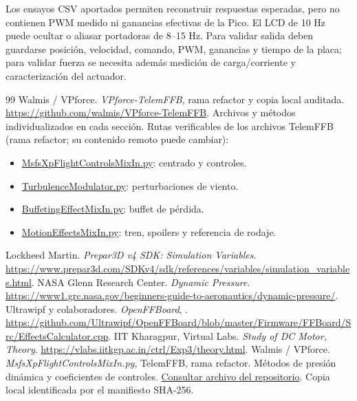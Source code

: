 \documentclass[11pt,a4paper]{article}
\newcommand{\code}[1]{\texttt{\detokenize{#1}}}
\begin{document}
Los ensayos CSV aportados permiten reconstruir respuestas esperadas, pero no contienen PWM medido ni ganancias efectivas de la Pico. El LCD de 10 Hz puede ocultar o aliasar portadoras de 8--15 Hz. Para validar salida deben guardarse posición, velocidad, comando, PWM, ganancias y tiempo de la placa; para validar fuerza se necesita además medición de carga/corriente y caracterización del actuador.

\begin{thebibliography}{99}
 Walmis / VPforce. \emph{VPforce-TelemFFB}, rama refactor y copia local auditada. \url{https://github.com/walmis/VPforce-TelemFFB}. Archivos y métodos individualizados en cada sección.
 Rutas verificables de los archivos TelemFFB (rama refactor; su contenido remoto puede cambiar):
\begin{itemize}
\item \href{https://github.com/walmis/VPforce-TelemFFB/blob/refactor/telemffb/sim/msfs_xp/MsfsXpFlightControlsMixIn.py}{MsfsXpFlightControlsMixIn.py}: centrado y controles.
\item \href{https://github.com/walmis/VPforce-TelemFFB/blob/refactor/telemffb/utils/TurbulenceModulator.py}{TurbulenceModulator.py}: perturbaciones de viento.
\item \href{https://github.com/walmis/VPforce-TelemFFB/blob/refactor/telemffb/sim/base/BuffetingEffectMixIn.py}{BuffetingEffectMixIn.py}: buffet de pérdida.
\item \href{https://github.com/walmis/VPforce-TelemFFB/blob/refactor/telemffb/sim/base/MotionEffectsMixIn.py}{MotionEffectsMixIn.py}: tren, spoilers y referencia de rodaje.
\end{itemize}
 Lockheed Martin. \emph{Prepar3D v4 SDK: Simulation Variables}. \url{https://www.prepar3d.com/SDKv4/sdk/references/variables/simulation_variables.html}.
 NASA Glenn Research Center. \emph{Dynamic Pressure}. \url{https://www1.grc.nasa.gov/beginners-guide-to-aeronautics/dynamic-pressure/}.
 Ultrawipf y colaboradores. \emph{OpenFFBoard}, \code{Firmware/FFBoard/Src/EffectsCalculator.cpp}. \url{https://github.com/Ultrawipf/OpenFFBoard/blob/master/Firmware/FFBoard/Src/EffectsCalculator.cpp}.
 IIT Kharagpur, Virtual Labs. \emph{Study of DC Motor, Theory}. \url{https://vlabs.iitkgp.ac.in/ctrl/Exp3/theory.html}.
 Walmis / VPforce. \emph{MsfsXpFlightControlsMixIn.py}, TelemFFB, rama refactor. Métodos de presión dinámica y coeficientes de controles. \href{https://github.com/walmis/VPforce-TelemFFB/blob/refactor/telemffb/sim/msfs_xp/MsfsXpFlightControlsMixIn.py}{Consultar archivo del repositorio}. Copia local identificada por el manifiesto SHA-256.

\end{thebibliography}
\end{document}
